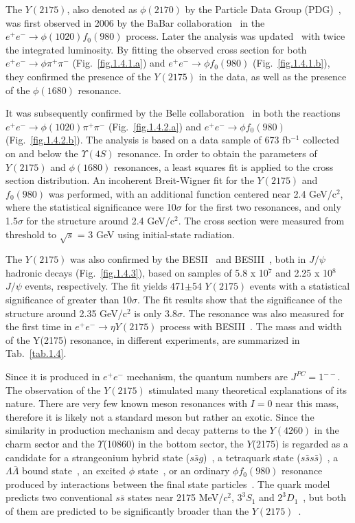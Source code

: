 The $Y(2175)$, also denoted as $\phi(2170)$ by the Particle Data Group (PDG)~\cite{Tanabashi18}, was first observed in 2006 by the BaBar collaboration~\cite{Aubert06} in the $e^{+}e^{-}\rightarrow \phi(1020)f_0(980)$ process. Later the analysis was updated~\cite{Aubert12} with twice the integrated luminosity. By fitting the observed cross section for both $e^{+}e^{-}\rightarrow \phi \pi^{+} \pi^{-}$ (Fig.~\ref{fig.1.4.1.a}) and $e^{+}e^{-}\rightarrow \phi f_0(980)$ (Fig.~\ref{fig.1.4.1.b}), they confirmed the presence of the $Y(2175)$ in the data, as well as the presence of the $\phi(1680)$ resonance.
~\par It was subsequently confirmed by the Belle collaboration~\cite{Shen09} in both the reactions $e^{+}e^{-}\rightarrow \phi(1020)\pi^{+}\pi^{-}$ (Fig.~\ref{fig.1.4.2.a}) and $e^{+}e^{-}\rightarrow \phi f_0(980)$ (Fig.~\ref{fig.1.4.2.b}). The analysis is based on a data sample of 673 fb$^{-1}$ collected on and below the $\Upsilon(4S)$ resonance. In order to obtain the parameters of $Y(2175)$ and $\phi(1680)$ resonances, a least squares fit is applied to the cross section distribution. An incoherent Breit-Wigner fit for the $Y(2175)$ and $f_0(980)$ was performed, with an additional function centered near 2.4 GeV/c$^2$, where the statistical significance were 10$\sigma$ for the first two resonances, and only 1.5$\sigma$ for the structure around 2.4 GeV/c$^2$. The cross section were measured from threshold to $\sqrt{s}$ = 3 GeV using initial-state radiation.
~\par The $Y(2175)$ was also confirmed by the BESII~\cite{Ablikim08} and BESIII~\cite{Ablikim15}, both in $J/\psi$ hadronic decays (Fig.~\ref{fig.1.4.3}), based on samples of 5.8 x 10$^7$ and 2.25 x 10$^8$ $J/\psi$ events, respectively. The fit yields 471$\pm$54 $Y(2175)$ events with a statistical significance of greater than 10$\sigma$. The fit results show that the significance of the structure around 2.35 GeV/c$^2$ is only 3.8$\sigma$. The resonance was also measured for the first time in $e^{+}e^{-}\rightarrow \eta Y(2175)$ process with BESIII~\cite{Ablikim19}. The mass and width of the Y(2175) resonance, in different experiments, are summarized in Tab.~\ref{tab.1.4}.
~\par Since it is produced in $e^+e^-$ mechanism, the quantum numbers are $J^{PC} = 1^{--}$. The observation of the $Y(2175)$ stimulated many theoretical explanations of its nature. There are very few known meson resonances with $I = 0$ near this mass, therefore it is likely not a standard meson but rather an exotic. Since the similarity in production mechanism and decay patterns to the $Y(4260)$ in the charm sector and the $\Upsilon$(10860) in the bottom sector, the $Y$(2175) is regarded as a candidate for a strangeonium hybrid state ($s\bar{s}g$)~\cite{Gui07}, a tetraquark state ($s\bar{s}s\bar{s}$)~\cite{Chen08}, a $\Lambda \bar{\Lambda}$ bound state~\cite{Klempt07}, an excited $\phi$ state~\cite{Coito09}, or an ordinary $\phi f_0(980)$ resonance produced by interactions between the final state particles~\cite{Alvarez09}. The quark model predicts two conventional $s\bar{s}$ states near 2175 MeV/$c^2$, ${3}^{3}\!S_{1}$ and ${2}^{3}\!D_{1}$~\cite{Godfrey85, Barnes97}, but both of them are predicted to be significantly broader than the $Y(2175)$~\cite{Barnes03, Ding07}.
